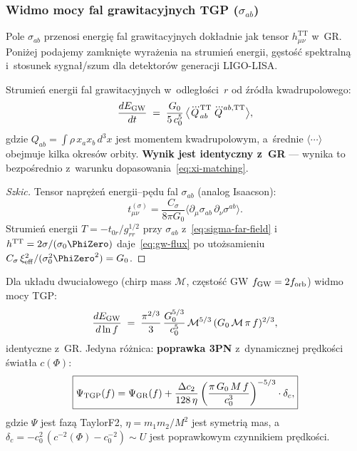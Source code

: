 \subsubsection{Widmo mocy fal grawitacyjnych TGP ($\sigma_{ab}$)}%
\label{sssec:gw-spectrum}

Pole $\sigma_{ab}$ przenosi energi\k{e} fal grawitacyjnych
dok\l{}adnie jak tensor $h_{\mu\nu}^{\mathrm{TT}}$ w~GR.
Poni\.zej podajemy zamkni\k{e}te wyra\.zenia na strumie\'n energii,
gęsto\'s\'c spektraln\k{a} i~stosunek sygna\l{}/szum
dla detektor\'ow generacji LIGO-LISA.

\begin{proposition}%
\label{prop:gw-flux}
Strumie\'n energii fal grawitacyjnych w~odleg\l{}o\'sci~$r$
od \'zr\'od\l{}a kwadrupolowego:
\begin{equation}\label{eq:gw-flux}
  \frac{dE_{\rm GW}}{dt}
  \;=\; \frac{G_0}{5\,c_0^5}\,
  \bigl\langle
    \dddot{Q}_{ab}^{\mathrm{TT}}\,\dddot{Q}^{ab,\mathrm{TT}}
  \bigr\rangle,
\end{equation}
gdzie $Q_{ab} = \int\!\rho\,x_a x_b\,d^3x$ jest momentem
kwadrupolowym, a~\'sre\-dnie $\langle\cdots\rangle$ obejmuje
kilka okres\'ow orbity.
\textbf{Wynik jest identyczny z~GR} --- wynika to
bezpo\'srednio z~warunku dopasowania~\eqref{eq:xi-matching}.
\end{proposition}

\begin{proof}[Szkic]
Tensor napr\k{e}\.ze\'n energii--p\k{e}du fal $\sigma_{ab}$
(analog Isaacson):
\[
  t_{\mu\nu}^{(\sigma)} = \frac{C_\sigma}{8\pi G_0}
  \langle \partial_\mu\sigma_{ab}\,\partial_\nu\sigma^{ab} \rangle.
\]
Strumie\'n energii $T = -t_{0r}/g_{rr}^{1/2}$
przy $\sigma_{ab}$ z~\eqref{eq:sigma-far-field}
i~$h^{\mathrm{TT}} = 2\sigma/(\sigma_0\PhiZero)$
daje~\eqref{eq:gw-flux} po uto\.zsamieniu
$C_\sigma\,\xi_{\mathrm{eff}}^2/(\sigma_0^2\PhiZero^2) = G_0$.
\end{proof}

\begin{proposition}%
\label{prop:gw-spectrum}
Dla uk\l{}adu dwucia\l{}owego (chirp mass $\mathcal{M}$,
cz\k{e}sto\'s\'c GW $f_{\rm GW} = 2f_{\rm orb}$)
widmo mocy TGP:
\begin{equation}\label{eq:gw-psd}
  \frac{dE_{\rm GW}}{d\ln f}
  \;=\; \frac{\pi^{2/3}}{3}\,\frac{G_0^{5/3}}{c_0^5}\,
  \mathcal{M}^{5/3}\,(G_0\,\mathcal{M}\,\pi\,f)^{2/3},
\end{equation}
identyczne z~GR\@.
Jedyna r\'o\.znica: \textbf{poprawka 3PN} z~dynamicznej
pr\k{e}dko\'sci \'swiat\l{}a $c(\Phi)$:
\begin{equation}\label{eq:3pn-correction}
  \boxed{
    \Psi_{\rm TGP}(f)
    = \Psi_{\rm GR}(f)
    + \frac{\Delta c_2}{128\,\eta}\,
    \biggl(\frac{\pi\,G_0\,M\,f}{c_0^3}\biggr)^{-5/3}
    \cdot \delta_c,
  }
\end{equation}
gdzie $\Psi$ jest faz\k{a} TaylorF2,
$\eta = m_1 m_2/M^2$ jest symetri\k{a} mas,
a~$\delta_c = -c_0^2\,(c^{-2}(\Phi) - c_0^{-2}) \sim U$
jest poprawkowym czynnikiem pr\k{e}dko\'sci.
\end{proposition}

